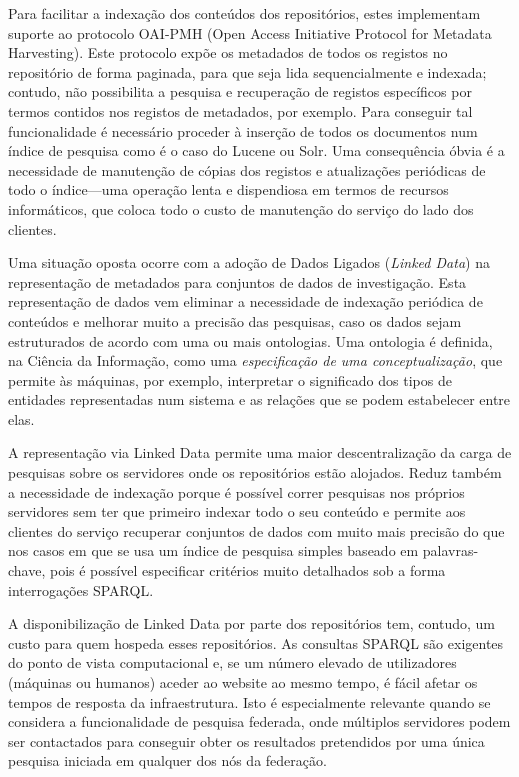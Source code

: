 \documentclass[sigconf,nonacm]{acmart}
\begin{document}
Para facilitar a indexação dos conteúdos dos repositórios, estes implementam suporte ao protocolo OAI-PMH (Open Access Initiative Protocol for Metadata Harvesting). Este protocolo expõe os metadados de todos os registos no repositório de forma paginada, para que seja lida sequencialmente e indexada; contudo, não possibilita a pesquisa e recuperação de registos específicos por termos contidos nos registos de metadados, por exemplo. Para conseguir tal funcionalidade é necessário proceder à inserção de todos os documentos num índice de pesquisa como é o caso do Lucene ou Solr. Uma consequência óbvia é a necessidade de manutenção de cópias dos registos e atualizações periódicas de todo o índice---uma operação lenta e dispendiosa em termos de recursos informáticos, que coloca todo o custo de manutenção do serviço do lado dos clientes.

Uma situação oposta ocorre com a adoção de Dados Ligados (\textit{Linked Data}) na representação de metadados para conjuntos de dados de investigação. Esta representação de dados vem eliminar a necessidade de indexação periódica de conteúdos e melhorar muito a precisão das pesquisas, caso os dados sejam estruturados de acordo com uma ou mais ontologias. Uma ontologia é definida, na Ciência da Informação, como uma \textit{especificação de uma conceptualização}\cite{gruber1995toward}, que permite às máquinas, por exemplo, interpretar o significado dos tipos de entidades representadas num sistema e as relações que se podem estabelecer entre elas.

A representação via Linked Data permite uma maior descentralização da carga de pesquisas sobre os servidores onde os repositórios estão alojados. Reduz também a necessidade de indexação porque é possível correr pesquisas nos próprios servidores sem ter que primeiro indexar todo o seu conteúdo e permite aos clientes do serviço recuperar conjuntos de dados com muito mais precisão do que nos casos em que se usa um índice de pesquisa simples baseado em palavras-chave, pois é possível especificar critérios muito detalhados sob a forma interrogações SPARQL.

A disponibilização de Linked Data por parte dos repositórios tem, contudo, um custo para quem hospeda esses repositórios. As consultas SPARQL são exigentes do ponto de vista computacional e, se um número elevado de utilizadores (máquinas ou humanos) aceder ao website ao mesmo tempo, é fácil afetar os tempos de resposta da infraestrutura. Isto é especialmente relevante quando se considera a funcionalidade de pesquisa federada, onde múltiplos servidores podem ser contactados para conseguir obter os resultados pretendidos por uma única pesquisa iniciada em qualquer dos nós da federação.
\end{document}
